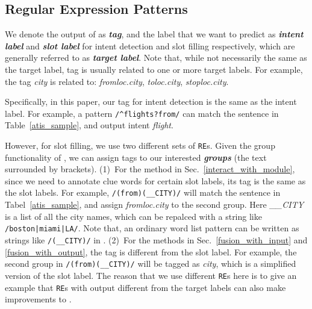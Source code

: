 \subsection{Regular Expression Patterns}
\label{re_desc}
We denote the output of \RE as \textbf{\emph{\RE tag}}, and the label that we want to predict as \textbf{\emph{intent label}} and \textbf{\emph{slot label}} for intent detection and slot filling respectively, which are generally referred to as \textbf{\emph{target label}}.
Note that, while not necessarily the same as the target label, \RE tag is usually related to one or more target labels. For example, the \RE tag \emph{city} is related to: \emph{fromloc.city}, \emph{toloc.city}, \emph{stoploc.city}.

Specifically, in this paper, our \RE tag for intent detection is the same as the intent label. For example, a pattern
\texttt{/\textasciicircum flights?\:from/} can match the sentence in Table~\ref{atis_sample}, and output intent \emph{flight}.

However, for slot filling, we use two different sets of \texttt{RE}s.
Given the group functionality of \RE, we can assign tags to our interested \textbf{\emph{\RE groups}} (the text surrounded by brackets).
(1)~For the method in Sec.~\ref{interact_with_module}, since we need to annotate clue words for certain slot labels, its \RE tag is the same as the slot labels.
For example, \texttt{/(from)\:(\_\_CITY)/} will match the sentence in Tabel~\ref{atis_sample}, and assign \emph{fromloc.city} to the second \RE group.
Here \emph{\_\_CITY} is a list of all the city names, which can be repalced with a string like \texttt{/boston|miami|LA/}.
Note that, an ordinary word list pattern can be written as strings like \texttt{/(\_\_CITY)/} in \RE.
(2)~For the methods in Sec.~\ref{fusion_with_input} and \ref{fusion_with_output}, the \RE tag is different from the slot label. For example, the second \RE group in \texttt{/(from)\:(\_\_CITY)/} will be tagged as \emph{city}, which is a simplified version of the slot label. The reason that we use different \texttt{RE}s here is to give an example that \texttt{RE}s with output different from the target labels can also make improvements to \NN.


